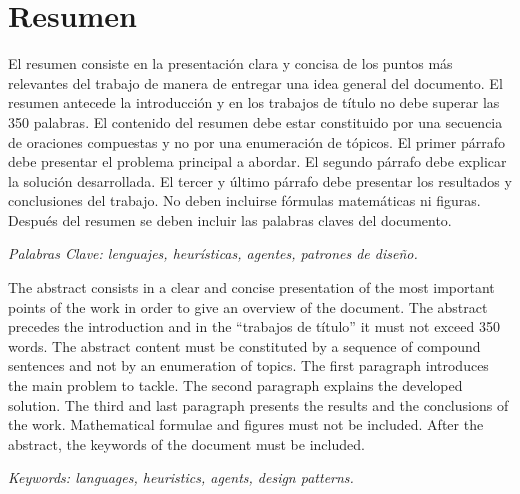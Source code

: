 \section*{Resumen}

\normalsize
El resumen consiste en la presentación clara y concisa de los puntos más relevantes del
trabajo de manera de entregar una idea general del documento. El resumen antecede la
introducción y en los trabajos de título no debe superar las 350 palabras. El contenido del
resumen debe estar constituido por una secuencia de oraciones compuestas y no por una
enumeración de tópicos. El primer párrafo debe presentar el problema principal a abordar. El
segundo párrafo debe explicar la solución desarrollada. El tercer y último párrafo debe
presentar los resultados y conclusiones del trabajo. No deben incluirse fórmulas matemáticas
ni figuras. Después del resumen se deben incluir las palabras claves del documento. 

\noindent
\textit{Palabras Clave: lenguajes, heurísticas, agentes, patrones de diseño.}

\noindent
{}

\normalsize
The abstract consists in a clear and concise presentation of the most important points of
the work in order to give an overview of the document. The abstract precedes the introduction
and in the “trabajos de título” it must not exceed 350 words. The abstract content must be
constituted by a sequence of compound sentences and not by an enumeration of topics. The
first paragraph introduces the main problem to tackle. The second paragraph explains the
developed solution. The third and last paragraph presents the results and the conclusions of the
work. Mathematical formulae and figures must not be included. After the abstract, the
keywords of the document must be included.

\noindent
\textit{Keywords: languages, heuristics, agents, design patterns. }
